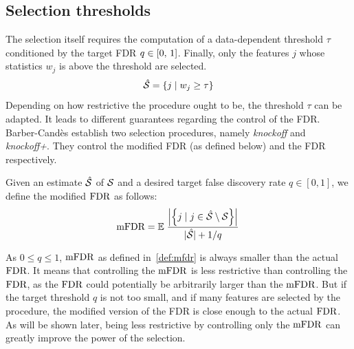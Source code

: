 \subsection{Selection thresholds}\label{subsec:kfs}

The selection itself requires the computation of a data-dependent threshold $\tau$
conditioned by the target FDR $q \in \left[ 0,\, 1 \right]$.%
Finally, only the features $j$ whose statistics $w_j$ is above the threshold are selected.
\begin{equation}
    \hat{\mathcal{S}} = \left\{ j \mid w_j \geq \tau \right\}
\end{equation}
Depending on how restrictive the procedure ought to be, the threshold $\tau$ can be adapted.
It leads to different guarantees regarding the control of the FDR\@.
Barber-Candès establish two selection procedures,
namely \emph{knockoff} and \emph{knockoff+}.
They control the modified FDR (as defined below) and the FDR respectively.
\begin{definition}\label{def:mfdr}
Given an estimate $\hat{\mathcal{S}}$ of $\mathcal{S}$ and a desired target false discovery rate $q \in [0, 1]$,
we define the modified $\text{FDR}$ as follows:
\begin{equation*}
    \text{mFDR} = {\mathbb E}\left.
        \frac
            {\left\lvert\left\{ j \mid j \in \hat{\mathcal{S}} \setminus \mathcal{S} \right\}\right\rvert}
            {\lvert\hat{\mathcal{S}}\rvert + 1 / q}
    \right.
\end{equation*}
\end{definition}
As $0 \leq q \leq 1$, $\text{mFDR}$ as defined in~\ref{def:mfdr} is always smaller than the actual $\text{FDR}$.
It means that controlling the $\text{mFDR}$ is less restrictive than controlling the $\text{FDR}$,
as the $\text{FDR}$ could potentially be arbitrarily larger than the $\text{mFDR}$.
But if the target threshold $q$ is not too small, and if many features are selected by the procedure,
the modified version of the FDR is close enough to the actual $\text{FDR}$.
As will be shown later, being less restrictive by controlling only the $\text{mFDR}$ can greatly improve the power
of the selection.

